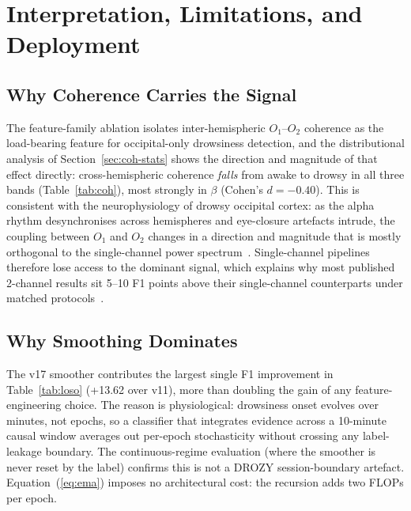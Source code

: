\documentclass[journal]{IEEEtran}
\DeclareRobustCommand{\add}[1]{#1}                         %
\DeclareRobustCommand{\del}[1]{}                           %
\DeclareRobustCommand{\add}[1]{\hl{#1}}
\DeclareRobustCommand{\del}[1]{{\color{delred}\sout{#1}}\,}
\DeclareRobustCommand{\del}[1]{}                         %
\DeclareRobustCommand{\chg}[2]{\del{#1}\add{#2}}
\begin{document}
\section{\chg{Discussion}{Interpretation, Limitations, and Deployment}}
\label{sec:discussion}
\subsection{Why Coherence Carries the Signal}
The feature-family ablation isolates inter-hemispheric \(O_1\)--\(O_2\) coherence as the load-bearing feature for occipital-only drowsiness detection, and the distributional analysis of Section~\ref{sec:coh-stats} shows the direction and magnitude of that effect directly: cross-hemispheric coherence \emph{falls} from awake to drowsy in all three bands (Table~\ref{tab:coh}), most strongly in \(\beta\) (Cohen's \(d=-0.40\)). This is consistent with the neurophysiology of drowsy occipital cortex: as the alpha rhythm desynchronises across hemispheres and eye-closure artefacts intrude, the coupling between \(O_1\) and \(O_2\) changes in a direction and magnitude that is mostly orthogonal to the single-channel power spectrum~\cite{stancin2021review,jap2009eeg}. Single-channel pipelines therefore lose access to the dominant signal, which explains why most published 2-channel results sit 5--10 F1 points above their single-channel counterparts under matched protocols~\cite{balam2024review}.

\subsection{Why Smoothing Dominates}
\label{sec:why-smooth}
The v17 smoother contributes the largest single F1 improvement in Table~\ref{tab:loso} (+13.62 over v11), more than doubling the gain of any feature-engineering choice. The reason is physiological: drowsiness onset evolves over minutes, not epochs, so a classifier that integrates evidence across a 10-minute causal window averages out per-epoch stochasticity without crossing any label-leakage boundary. The continuous-regime evaluation (where the smoother is never reset by the label) confirms this is not a DROZY session-boundary artefact. Equation~(\ref{eq:ema}) imposes no architectural cost: the recursion adds two FLOPs per epoch.
\end{document}
